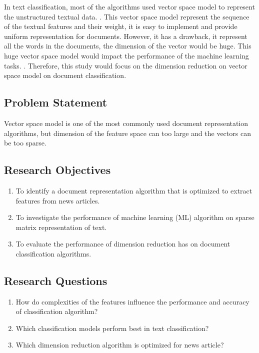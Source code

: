 In text classification, most of the algorithms used vector space model to represent the unstructured textual data. \cite{vectorSpaceModelText}. This vector space model represent the sequence of the textual features and their weight, it is easy to implement and provide uniform representation for documents. However, it has a drawback, it represent all the words in the documents, the dimension of the vector would be huge. This huge vector space model would impact the performance of the machine learning tasks. \cite{knnVectorSpaceReduction}. Therefore, this study would focus on the dimension reduction on vector space model on document classification.\\

\subsection{Problem Statement}
Vector space model is one of the most commonly used document representation algorithms, but dimension of the feature space can too large and the vectors can be too sparse. \cite{knnVectorSpaceReduction}\\

\clearpage
\subsection{Research Objectives}
\begin{enumerate}
	\item To identify a document representation algorithm that is optimized to extract features from news articles.
	\item To investigate the performance of machine learning (ML) algorithm on sparse matrix representation of text.
	\item To evaluate the performance of dimension reduction has on document classification algorithms.
\end{enumerate}


\subsection{Research Questions}
\begin{enumerate}
	\item How do complexities of the features influence the performance and accuracy of classification algorithm?
	\item Which classification models perform best in text classification?
	\item Which dimension reduction algorithm is optimized for news article?
\end{enumerate}

